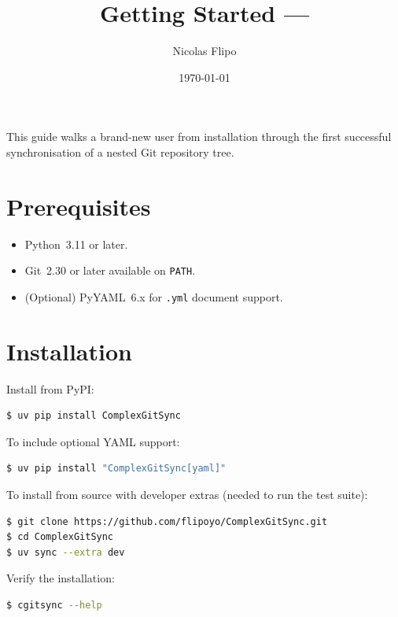 \documentclass[11pt,a4paper]{article}
\title{Getting Started --- \cgspkg{} \cgsversion}
\author{Nicolas Flipo}
\date{\today}
\begin{document}
\maketitle

This guide walks a brand-new user from installation through the first
successful synchronisation of a nested Git repository tree.

\section{Prerequisites}

\begin{itemize}
  \item Python~3.11 or later.
  \item Git~2.30 or later available on \texttt{PATH}.
  \item (Optional) PyYAML~6.x for \texttt{.yml} document support.
\end{itemize}

\section{Installation}

Install \cgspkg{} from PyPI:

\begin{lstlisting}[language=bash]
$ uv pip install ComplexGitSync
\end{lstlisting}

To include optional YAML support:

\begin{lstlisting}[language=bash]
$ uv pip install "ComplexGitSync[yaml]"
\end{lstlisting}

To install from source with developer extras (needed to run the test suite):

\begin{lstlisting}[language=bash]
$ git clone https://github.com/flipoyo/ComplexGitSync.git
$ cd ComplexGitSync
$ uv sync --extra dev
\end{lstlisting}

Verify the installation:

\begin{lstlisting}[language=bash]
$ cgitsync --help
\end{lstlisting}
\end{document}
